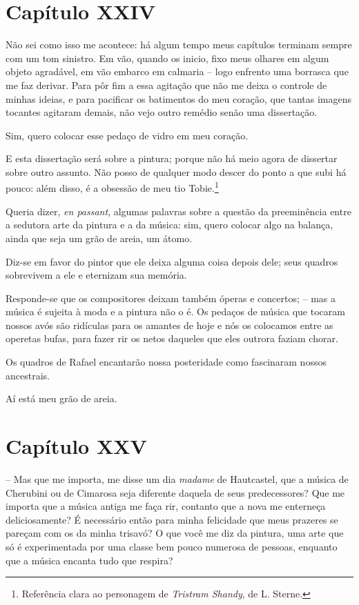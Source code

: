 \section{Capítulo XXIV}

 Não sei como isso me acontece: há algum tempo meus capítulos terminam
sempre com um tom sinistro. Em vão, quando os inicio, fixo meus olhares
em algum objeto agradável, em vão embarco em calmaria -- logo
enfrento uma borrasca que me faz derivar. Para pôr fim a essa agitação
que não me deixa o controle de minhas ideias, e para pacificar os
batimentos do meu coração, que tantas imagens tocantes agitaram demais,
não vejo outro remédio senão uma dissertação.

Sim, quero colocar esse pedaço de vidro em meu coração.

E esta dissertação será sobre a pintura; porque não há meio agora de
dissertar sobre outro assunto. Não posso de qualquer modo descer do
ponto a que subi há pouco: além disso, é a obsessão de meu tio
Tobie.\footnote{ Referência clara ao personagem de \textit{Tristram
Shandy}, de L. Sterne.} 

Queria dizer, \textit{en passant}, algumas palavras sobre a questão da
preeminência entre a sedutora arte da pintura e a da música: sim, quero
colocar algo na balança, ainda que seja um grão de areia, um átomo.

Diz-se em favor do pintor que ele deixa alguma coisa depois dele; seus
quadros sobrevivem a ele e eternizam sua memória. 

Responde-se que os compositores deixam também óperas e concertos; --
mas a música é sujeita à moda e a pintura não o é. Os pedaços de música
que tocaram nossos avós são ridículas para os amantes de hoje e nós os
colocamos entre as operetas bufas, para fazer rir os netos daqueles que
eles outrora faziam chorar.

Os quadros de Rafael encantarão nossa posteridade como fascinaram nossos
ancestrais.

Aí está meu grão de areia.

\section{Capítulo XXV}

 -- Mas que me importa, me disse um dia \textit{madame} de Hautcastel,
que a música de Cherubini ou de Cimarosa seja diferente daquela de seus
predecessores? Que me importa que a música antiga me faça rir, contanto
que a nova me enterneça deliciosamente? É necessário então para minha
felicidade que meus prazeres se pareçam com os da minha trisavó? O que
você me diz da pintura, uma arte que só é experimentada por uma classe
bem pouco numerosa de pessoas, enquanto que a música encanta tudo que
respira?

